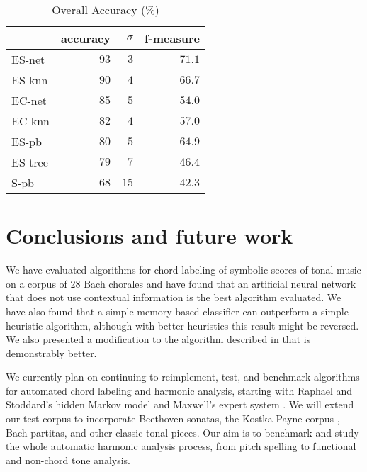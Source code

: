\documentclass{article}
\begin{document}
\begin{table}
  \centering
  \begin{tabular}{l|rrr}
       & accuracy& $\sigma$  & f-measure\\
\hline
ES-net &$   93  $&$  3$      &$71.1$ \\
ES-knn &$   90  $&$  4$      &$66.7$ \\
EC-net &$   85  $&$  5$      &$54.0$ \\
EC-knn &$   82  $&$  4$      &$57.0$ \\
ES-pb  &$   80  $&$  5$      &$64.9$ \\
ES-tree&$   79  $&$  7$      &$46.4$ \\
S-pb   &$   68  $&$ 15$      &$42.3$ \\

  \end{tabular}                                                        


  \caption{Overall Accuracy (\%)}
  \label{tab:accuracy}
\end{table}

\section{Conclusions and future work}
\label{sec:conclusions}

We have evaluated algorithms for chord labeling of symbolic scores of
tonal music on a corpus of 28 Bach chorales and have found that an
artificial neural network that does not use contextual information is
the best algorithm evaluated. We have also found that a simple
memory-based classifier can outperform a simple heuristic algorithm,
although with better heuristics this result might be reversed. We also
presented a modification to the algorithm described in
\cite{pardo.ea02:algorithms} that is demonstrably better.

We currently plan on continuing to reimplement, test, and benchmark
algorithms for automated chord labeling and harmonic analysis,
starting with Raphael and Stoddard's hidden Markov model
\cite{raphael.ea03:harmonic} and Maxwell's expert system
\cite{maxwell92:expert}.  We will extend our test corpus to
incorporate Beethoven sonatas, the Kostka-Payne corpus
\cite{temperley04:bayesian}, Bach partitas, and other classic tonal
pieces. Our aim is to benchmark and study the whole automatic harmonic
analysis process, from pitch spelling to functional and non-chord tone
analysis.



\end{document}
